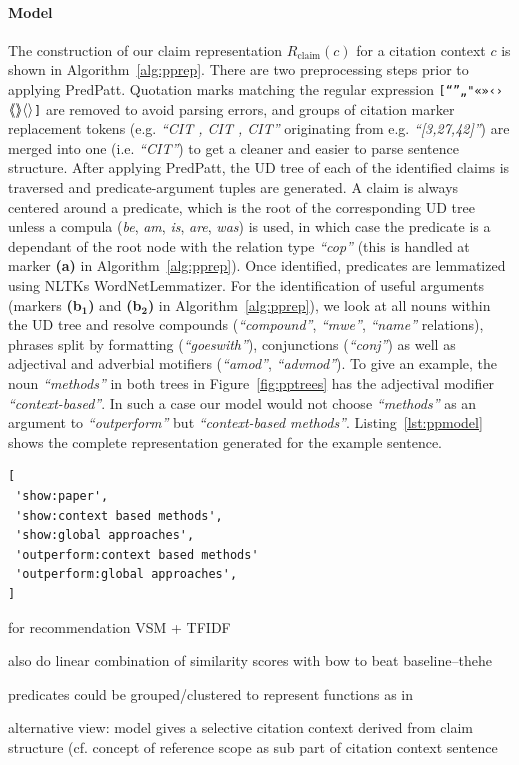 \paragraph{Model} The construction of our claim representation $R_{\text{claim}}(c)$ for a citation context $c$ is shown in Algorithm~\ref{alg:pprep}. There are two preprocessing steps prior to applying PredPatt. Quotation marks matching the regular expression \texttt{[“”„"«»‹›$\mathtt{\langle\hspace{-1mm}\langle\rangle\hspace{-1mm}\rangle\langle\rangle}$]} are removed to avoid parsing errors, and groups of citation marker replacement tokens (e.g. \emph{``CIT , CIT , CIT''} originating from e.g. \emph{``[3,27,42]''}) are merged into one (i.e. \emph{``CIT''}) to get a cleaner and easier to parse sentence structure. After applying PredPatt, the UD tree of each of the identified claims is traversed and predicate-argument tuples are generated. A claim is always centered around a predicate, which is the root of the corresponding UD tree unless a compula (\emph{be}, \emph{am}, \emph{is}, \emph{are}, \emph{was}) is used, in which case the predicate is a dependant of the root node with the relation type \emph{``cop''} (this is handled at marker \textbf{(a)} in Algorithm~\ref{alg:pprep}). Once identified, predicates are lemmatized using NLTKs WordNetLemmatizer. For the identification of useful arguments (markers \textbf{(b$_\mathbf{1}$)} and \textbf{(b$_\mathbf{2}$)} in Algorithm~\ref{alg:pprep}), we look at all nouns within the UD tree and resolve compounds (\emph{``compound''}, \emph{``mwe''}, \emph{``name''} relations), phrases split by formatting (\emph{``goeswith''}), conjunctions (\emph{``conj''}) as well as adjectival and adverbial motifiers (\emph{``amod''}, \emph{``advmod''}). To give an example, the noun \emph{``methods''} in both trees in Figure~\ref{fig:pptrees} has the adjectival modifier \emph{``context-based''}. In such a case our model would not choose \emph{``methods''} as an argument to \emph{``outperform''} but \emph{``context-based methods''}. Listing~\ref{lst:ppmodel} shows the complete representation generated for the example sentence.

\begin{lstlisting}[caption={An example of $R_{\text{claim}}(c)$.},label={lst:ppmodel}]
[
 'show:paper',
 'show:context based methods',
 'show:global approaches',
 'outperform:context based methods'
 'outperform:global approaches',
]
\end{lstlisting}

for recommendation VSM + TFIDF

also do linear combination of similarity scores with bow to beat baseline--thehe

predicates could be grouped/clustered to represent functions as in \cite{Gabor2018}

alternative view: model gives a selective citation context derived from claim structure (cf. concept of reference scope as sub part of citation context sentence\cite{Abujbara2012,RAHUL2017}

